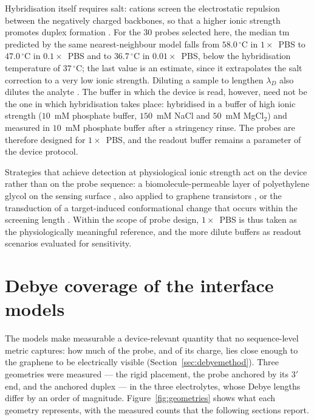 Hybridisation itself requires salt: cations screen the electrostatic repulsion between the negatively
charged backbones, so that a higher ionic strength promotes duplex formation \citep{campos2019}. For the
$30$ probes selected here, the median \acrshort{tm} predicted by the same nearest-neighbour model falls
from $58.0\,^{\circ}$C in $1\times$~PBS to $47.0\,^{\circ}$C in $0.1\times$~PBS and to $36.7\,^{\circ}$C
in $0.01\times$~PBS, below the hybridisation temperature of $37\,^{\circ}$C; the last value is an
estimate, since it extrapolates the salt correction to a very low ionic strength. Diluting a sample to
lengthen $\lambda_D$ also dilutes the analyte \citep{kesler2020}. The buffer in which the device is read,
however, need not be the one in which hybridisation takes place: \citet{campos2019} hybridised in a
buffer of high ionic strength ($10$~mM phosphate buffer, $150$~mM NaCl and $50$~mM MgCl$_2$) and measured
in $10$~mM phosphate buffer after a stringency rinse. The probes are therefore designed for
$1\times$~PBS, and the readout buffer remains a parameter of the device protocol.

Strategies that achieve detection at physiological ionic strength act on the device rather than on the
probe sequence: a biomolecule-permeable layer of polyethylene glycol on the sensing surface
\citep{gao2015}, also applied to graphene transistors \citep{gao2016}, or the transduction of a
target-induced conformational change that occurs within the screening length \citep{nakatsuka2018}.
Within the scope of probe design, $1\times$~PBS is thus taken as the physiologically meaningful
reference, and the more dilute buffers as readout scenarios evaluated for sensitivity.

\section{Debye coverage of the interface models}
\label{sec:debyeres}

The models make measurable a device-relevant quantity that no sequence-level metric captures: how
much of the probe, and of its charge, lies close enough to the graphene to be electrically visible
(Section~\ref{sec:debyemethod}). Three geometries were measured --- the rigid placement, the probe
anchored by its $3'$ end, and the anchored duplex --- in the three electrolytes, whose Debye lengths
differ by an order of magnitude. Figure~\ref{fig:geometries} shows what each geometry represents,
with the measured counts that the following sections report.

